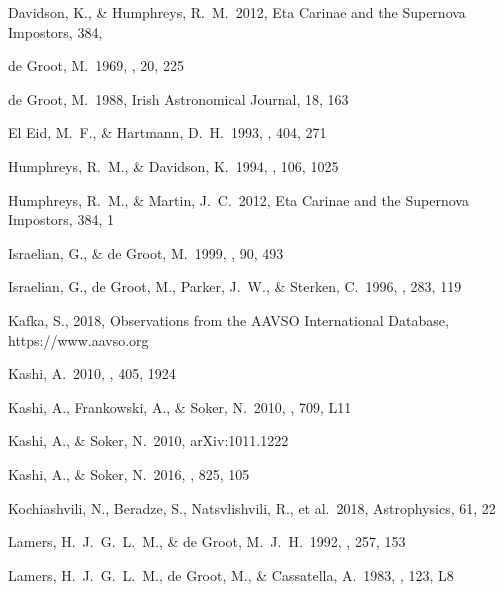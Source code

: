 \documentclass[twocolumn]{aastex62}
\begin{document}
\begin{thebibliography}

 Davidson, K., \& Humphreys, R.~M.\ 2012, Eta Carinae and the Supernova Impostors, 384,  

 de Groot, M.\ 1969, \bain, 20, 225 %

 de Groot, M.\ 1988, Irish Astronomical Journal, 18, 163 %

 El Eid, M.~F., \& Hartmann, D.~H.\ 1993, \apj, 404, 271 

 Humphreys, R.~M., \& Davidson, K.\ 1994, \pasp, 106, 1025 

 Humphreys, R.~M., \& Martin, J.~C.\ 2012, Eta Carinae and the Supernova Impostors, 384, 1 

 Israelian, G., \& de Groot, M.\ 1999, \ssr, 90, 493 

 Israelian, G., de Groot, M., Parker, J.~W., \& Sterken, C.\ 1996, \mnras, 283, 119 

 Kafka, S., 2018, Observations from the AAVSO International Database, https://www.aavso.org

 Kashi, A.\ 2010, \mnras, 405, 1924 %


 Kashi, A., Frankowski, A., \& Soker, N.\ 2010, \apjl, 709, L11 

 Kashi, A., \& Soker, N.\ 2010, arXiv:1011.1222 %

 Kashi, A., \& Soker, N.\ 2016, \apj, 825, 105

 Kochiashvili, N., Beradze, S., Natsvlishvili, R., et al.\ 2018, Astrophysics, 61, 22 

 Lamers, H.~J.~G.~L.~M., \& de Groot, M.~J.~H.\ 1992, \aap, 257, 153 

 Lamers, H.~J.~G.~L.~M., de Groot, M., \& Cassatella, A.\ 1983, \aap, 123, L8 


\end{thebibliography}
\end{document}
